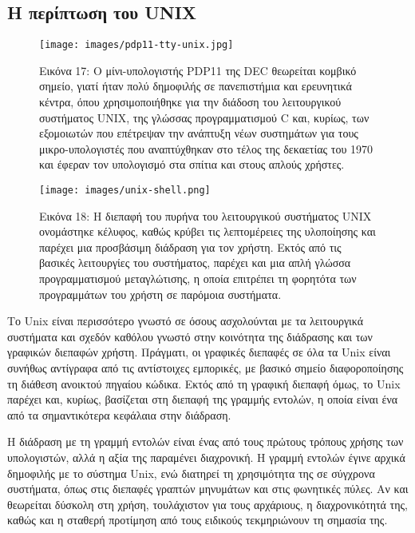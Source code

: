 \documentclass[
]{article}
\begin{document}
\hypertarget{ux3b7-ux3c0ux3b5ux3c1ux3afux3c0ux3c4ux3c9ux3c3ux3b7-ux3c4ux3bfux3c5-unix}{%
\subsection{Η περίπτωση του
UNIX}\label{ux3b7-ux3c0ux3b5ux3c1ux3afux3c0ux3c4ux3c9ux3c3ux3b7-ux3c4ux3bfux3c5-unix}}

\leavevmode{}%
\begin{figure}
\hypertarget{fig:pdp11-tty-unix}{%
\centering
\texttt{[image: images/pdp11-tty-unix.jpg]}
\caption{Εικόνα 17: Ο μίνι-υπολογιστής PDP11 της DEC θεωρείται κομβικό
σημείο, γιατί ήταν πολύ δημοφιλής σε πανεπιστήμια και ερευνητικά κέντρα,
όπου χρησιμοποιήθηκε για την διάδοση του λειτουργικού συστήματος UNIX,
της γλώσσας προγραμματισμού C και, κυρίως, των εξομοιωτών που επέτρεψαν
την ανάπτυξη νέων συστημάτων για τους μικρο-υπολογιστές που αναπτύχθηκαν
στο τέλος της δεκαετίας του 1970 και έφεραν τον υπολογισμό στα σπίτια
και στους απλούς χρήστες.}\label{fig:pdp11-tty-unix}
}
\end{figure}

\leavevmode{}%
\begin{figure}
\hypertarget{fig:unix-shell}{%
\centering
\texttt{[image: images/unix-shell.png]}
\caption{Εικόνα 18: Η διεπαφή του πυρήνα του λειτουργικού συστήματος
UNIX ονομάστηκε κέλυφος, καθώς κρύβει τις λεπτομέρειες της υλοποίησης
και παρέχει μια προσβάσιμη διάδραση για τον χρήστη. Εκτός από τις
βασικές λειτουργίες του συστήματος, παρέχει και μια απλή γλώσσα
προγραμματισμού μεταγλώτισης, η οποία επιτρέπει τη φορητότα των
προγραμμάτων του χρήστη σε παρόμοια συστήματα.}\label{fig:unix-shell}
}
\end{figure}

Το Unix είναι περισσότερο γνωστό σε όσους ασχολούνται με τα λειτουργικά
συστήματα και σχεδόν καθόλου γνωστό στην κοινότητα της διάδρασης και των
γραφικών διεπαφών χρήστη. Πράγματι, οι γραφικές διεπαφές σε όλα τα Unix
είναι συνήθως αντίγραφα από τις αντίστοιχες εμπορικές, με βασικό σημείο
διαφοροποίησης τη διάθεση ανοικτού πηγαίου κώδικα. Εκτός από τη γραφική
διεπαφή όμως, το Unix παρέχει και, κυρίως, βασίζεται στη διεπαφή της
γραμμής εντολών, η οποία είναι ένα από τα σημαντικότερα κεφάλαια στην
διάδραση.

Η διάδραση με τη γραμμή εντολών είναι ένας από τους πρώτους τρόπους
χρήσης των υπολογιστών, αλλά η αξία της παραμένει διαχρονική. Η γραμμή
εντολών έγινε αρχικά δημοφιλής με το σύστημα Unix, ενώ διατηρεί τη
χρησιμότητα της σε σύγχρονα συστήματα, όπως στις διεπαφές γραπτών
μηνυμάτων και στις φωνητικές πύλες. Αν και θεωρείται δύσκολη στη χρήση,
τουλάχιστον για τους αρχάριους, η διαχρονικότητά της, καθώς και η
σταθερή προτίμηση από τους ειδικούς τεκμηριώνουν τη σημασία της.
\end{document}
